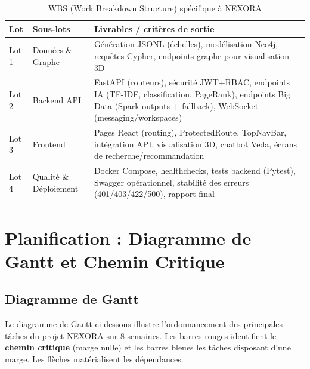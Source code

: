\documentclass[12pt,a4paper]{report}
\begin{document}
\begin{table}[H]
\centering
\caption{WBS (Work Breakdown Structure) spécifique à NEXORA}
\label{tab:wbs_nexora}
\begin{tabular}{p{2.8cm} p{5cm} p{6.5cm}}
\toprule
\textbf{Lot} & \textbf{Sous-lots} & \textbf{Livrables / critères de sortie} \\
\midrule
Lot 1 & Données \& Graphe & Génération JSONL (échelles), modélisation Neo4j, requêtes Cypher, endpoints graphe pour visualisation 3D \\
Lot 2 & Backend API & FastAPI (routeurs), sécurité JWT+RBAC, endpoints IA (TF-IDF, classification, PageRank), endpoints Big Data (Spark outputs + fallback), WebSocket (messaging/workspaces) \\
Lot 3 & Frontend & Pages React (routing), ProtectedRoute, TopNavBar, intégration API, visualisation 3D, chatbot Veda, écrans de recherche/recommandation \\
Lot 4 & Qualité \& Déploiement & Docker Compose, healthchecks, tests backend (Pytest), Swagger opérationnel, stabilité des erreurs (401/403/422/500), rapport final \\
\bottomrule
\end{tabular}
\end{table}

\section{Planification : Diagramme de Gantt et Chemin Critique}

\subsection{Diagramme de Gantt}
Le diagramme de Gantt ci-dessous illustre l'ordonnancement des principales tâches du projet NEXORA sur 8 semaines. Les barres rouges identifient le \textbf{chemin critique} (marge nulle) et les barres bleues les tâches disposant d'une marge. Les flèches matérialisent les dépendances.

\end{document}
